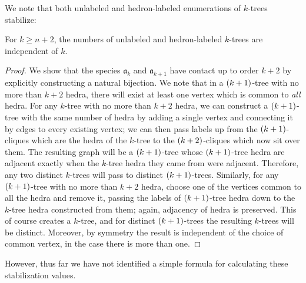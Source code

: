 \documentclass[sectionflow,singlespace,twoside,boldmathhdr]{brandiss} %
\numberwithin{section}{chapter}
\numberwithin{figure}{chapter}
\begin{document}
We note that both unlabeled and hedron-labeled enumerations of $k$-trees stabilize:
\begin{theorem}
  \label{thm:ktreestab}
  For $k \geq n + 2$, the numbers of unlabeled and hedron-labeled $k$-trees are independent of $k$.
\end{theorem}
\begin{proof}
  We show that the species $\mathfrak{a}_{k}$ and $\mathfrak{a}_{k+1}$ have contact up to order $k+2$ by explicitly constructing a natural bijection.
  We note that in a $\left( {k+1} \right)$-tree with no more than $k+2$ hedra, there will exist at least one vertex which is common to \emph{all} hedra.
  For any $k$-tree with no more than $k+2$ hedra, we can construct a $\left( {k+1} \right)$-tree with the same number of hedra by adding a single vertex and connecting it by edges to every existing vertex; we can then pass labels up from the $\left( {k+1} \right)$-cliques which are the hedra of the $k$-tree to the $\left( {k+2} \right)$-cliques which now sit over them.
  The resulting graph will be a $\left( {k+1} \right)$-tree whose $\left( {k+1} \right)$-tree hedra are adjacent exactly when the $k$-tree hedra they came from were adjacent.
  Therefore, any two distinct $k$-trees will pass to distinct $\left( {k+1} \right)$-trees.
  Similarly, for any $\left( {k+1} \right)$-tree with no more than $k+2$ hedra, choose one of the vertices common to all the hedra and remove it, passing the labels of $\left( {k+1} \right)$-tree hedra down to the $k$-tree hedra constructed from them; again, adjacency of hedra is preserved.
  This of course creates a $k$-tree, and for distinct $\left( {k+1} \right)$-trees the resulting $k$-trees will be distinct.
  Moreover, by symmetry the result is independent of the choice of common vertex, in the case there is more than one.
\end{proof}
However, thus far we have not identified a simple formula for calculating these stabilization values.
\end{document}

